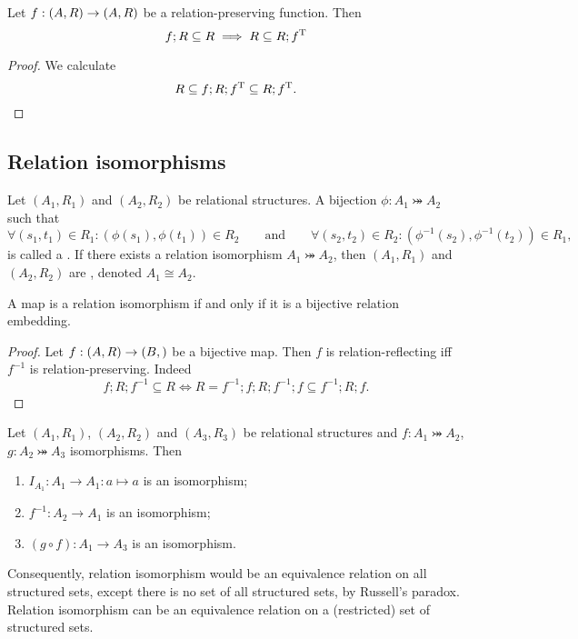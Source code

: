 \begin{lemma} \label{expansiveRelationPreserving}
Let $f: \left( A,R \right) \to \left( A,R \right)$ be a relation-preserving function. Then
\[ f;R \subseteq R \implies R \subseteq R;f^{\mathrm{T}} \]
\end{lemma}
\begin{proof}
We calculate
\[ R \subseteq f;R;f^{\mathrm{T}} \subseteq R;f^{\mathrm{T}}. \]
\end{proof}

\subsection{Relation isomorphisms}
\begin{definition}
Let $(A_1, R_1)$ and $(A_2, R_2)$ be relational structures. A bijection $\phi:A_1 \twoheadrightarrowtail A_2$ such that
\[ \forall (s_1,t_1)\in R_1: (\phi(s_1),\phi(t_1))\in R_2 \qquad \text{and} \qquad \forall (s_2,t_2)\in R_2: (\phi^{-1}(s_2),\phi^{-1}(t_2))\in R_1, \]
is called a . If there exists a relation isomorphism $A_1 \twoheadrightarrowtail A_2$, then $(A_1, R_1)$ and $(A_2, R_2)$ are , denoted $A_1 \cong A_2$.
\end{definition}

\begin{lemma}
A map is a relation isomorphism \textup{if and only if} it is a bijective relation embedding.
\end{lemma}
\begin{proof}
Let $f: \left( A, R \right)\to \left( B,  \right)$ be a bijective map. Then $f$ is relation-reflecting iff $f^{-1}$ is relation-preserving. Indeed
\[ f;R;f^{-1} \subseteq R \iff R = f^{-1};f;R;f^{-1};f \subseteq f^{-1};R;f. \]
\end{proof}

\begin{lemma} \label{isomorphismEquivalence}
Let $(A_1, R_1)$, $(A_2, R_2)$ and $(A_3, R_3)$ be relational structures and $f:A_1 \twoheadrightarrowtail A_2$, $g:A_2 \twoheadrightarrowtail A_3$ isomorphisms. Then
\begin{enumerate}
\item $I_{A_1}: A_1 \to A_1: a\mapsto a$ is an isomorphism;
\item $f^{-1}: A_2\to A_1$ is an isomorphism;
\item $(g\circ f): A_1\to A_3$ is an isomorphism.
\end{enumerate}
\end{lemma}
Consequently, relation isomorphism would be an equivalence relation on all structured sets, except there is no set of all structured sets, by Russell's paradox. Relation isomorphism can be an equivalence relation on a (restricted) set of structured sets.

